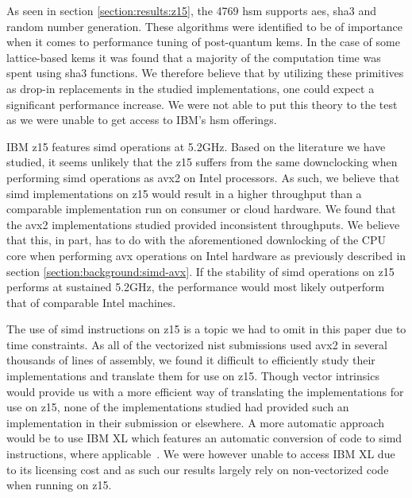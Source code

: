 As seen in section \ref{section:results:z15}, the 4769 \gls{hsm} supports \gls{aes}, \gls{sha3} and random number generation. These algorithms were identified to be of importance when it comes to performance tuning of \gls{post-quantum} \glspl{kem}. In the case of some lattice-based \glspl{kem} it was found that a majority of the computation time was spent using \gls{sha3} functions. We therefore believe that by utilizing these primitives as drop-in replacements in the studied implementations, one could expect a significant performance increase. We were not able to put this theory to the test as we were unable to get access to IBM's \gls{hsm} offerings.

IBM \gls{z15} features \gls{simd} operations at 5.2GHz. Based on the literature we have studied, it seems unlikely that the \gls{z15} suffers from the same downclocking when performing \gls{simd} operations as \gls{avx2} on Intel processors. As such, we believe that \gls{simd} implementations on \gls{z15} would result in a higher throughput than a comparable implementation run on consumer or cloud hardware. We found that the \gls{avx2} implementations studied provided inconsistent throughputs. We believe that this, in part, has to do with the aforementioned downlocking of the CPU core when performing \gls{avx} operations on Intel hardware as previously described in section \ref{section:background:simd-avx}. If the stability of \gls{simd} operations on \gls{z15} performs at sustained 5.2GHz, the performance would most likely outperform that of comparable Intel machines.

The use of \gls{simd} instructions on \gls{z15} is a topic we had to omit in this paper due to time constraints. As all of the vectorized \gls{nist} submissions used \gls{avx2} in several thousands of lines of assembly, we found it difficult to efficiently study their implementations and translate them for use on \gls{z15}. Though vector intrinsics would provide us with a more efficient way of translating the implementations for use on \gls{z15}, none of the implementations studied had provided such an implementation in their submission or elsewhere. A more automatic approach would be to use IBM XL which features an automatic conversion of code to \gls{simd} instructions, where applicable~\cite{ibm:xl-autosimd}. We were however unable to access IBM XL due to its licensing cost and as such our results largely rely on non-vectorized code when running on \gls{z15}.

